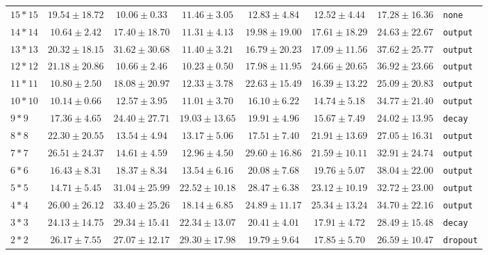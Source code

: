 \documentclass[conference]{IEEEtran}
\begin{document}
\begin{longtable}{@{}lccccccl@{}}
$15*15$ & \bfseries $19.54 \pm 18.72$ & $10.06 \pm 0.33$ & $11.46 \pm 3.05$ & $12.83 \pm 4.84$ & $12.52 \pm 4.44$ & $17.28 \pm 16.36$ & \texttt{none} \\
$14*14$ & $10.64 \pm 2.42$ & $17.40 \pm 18.70$ & $11.31 \pm 4.13$ & $19.98 \pm 19.00$ & $17.61 \pm 18.29$ & \bfseries $24.63 \pm 22.67$ & \texttt{output} \\
$13*13$ & $20.32 \pm 18.15$ & $31.62 \pm 30.68$ & $11.40 \pm 3.21$ & $16.79 \pm 20.23$ & $17.09 \pm 11.56$ & \bfseries $37.62 \pm 25.77$ & \texttt{output} \\
$12*12$ & $21.18 \pm 20.86$ & $10.66 \pm 2.46$ & $10.23 \pm 0.50$ & $17.98 \pm 11.95$ & $24.66 \pm 20.65$ & \bfseries $36.92 \pm 23.66$ & \texttt{output} \\
$11*11$ & $10.80 \pm 2.50$ & $18.08 \pm 20.97$ & $12.33 \pm 3.78$ & $22.63 \pm 15.49$ & $16.39 \pm 13.22$ & \bfseries $25.09 \pm 20.83$ & \texttt{output} \\
$10*10$ & $10.14 \pm 0.66$ & $12.57 \pm 3.95$ & $11.01 \pm 3.70$ & $16.10 \pm 6.22$ & $14.74 \pm 5.18$ & \bfseries $34.77 \pm 21.40$ & \texttt{output} \\
$9*9$ & $17.36 \pm 4.65$ & \bfseries $24.40 \pm 27.71$ & $19.03 \pm 13.65$ & $19.91 \pm 4.96$ & $15.67 \pm 7.49$ & $24.02 \pm 13.95$ & \texttt{decay} \\
$8*8$ & $22.30 \pm 20.55$ & $13.54 \pm 4.94$ & $13.17 \pm 5.06$ & $17.51 \pm 7.40$ & $21.91 \pm 13.69$ & \bfseries $27.05 \pm 16.31$ & \texttt{output} \\
$7*7$ & $26.51 \pm 24.37$ & $14.61 \pm 4.59$ & $12.96 \pm 4.50$ & $29.60 \pm 16.86$ & $21.59 \pm 10.11$ & \bfseries $32.91 \pm 24.74$ & \texttt{output} \\
$6*6$ & $16.43 \pm 8.31$ & $18.37 \pm 8.34$ & $13.54 \pm 6.16$ & $20.08 \pm 7.68$ & $19.76 \pm 5.07$ & \bfseries $38.04 \pm 22.00$ & \texttt{output} \\
$5*5$ & $14.71 \pm 5.45$ & $31.04 \pm 25.99$ & $22.52 \pm 10.18$ & $28.47 \pm 6.38$ & $23.12 \pm 10.19$ & \bfseries $32.72 \pm 23.00$ & \texttt{output} \\
$4*4$ & $26.00 \pm 26.12$ & $33.40 \pm 25.26$ & $18.14 \pm 6.85$ & $24.89 \pm 11.17$ & $25.34 \pm 13.24$ & \bfseries $34.70 \pm 22.16$ & \texttt{output} \\
$3*3$ & $24.13 \pm 14.75$ & \bfseries $29.34 \pm 15.41$ & $22.34 \pm 13.07$ & $20.41 \pm 4.01$ & $17.91 \pm 4.72$ & $28.49 \pm 15.48$ & \texttt{decay} \\
$2*2$ & $26.17 \pm 7.55$ & $27.07 \pm 12.17$ & \bfseries $29.30 \pm 17.98$ & $19.79 \pm 9.64$ & $17.85 \pm 5.70$ & $26.59 \pm 10.47$ & \texttt{dropout} \\

\end{longtable}
\end{document}
